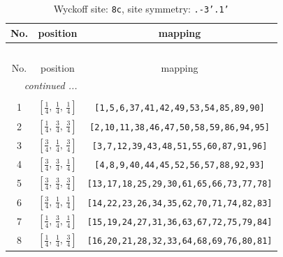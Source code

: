 \documentclass[fleqn,8pt]{jsarticle}
\begin{document}
\begin{longtable}{ccc}
\caption{Wyckoff site: {\tt 8c}, site symmetry: {\tt .-3'.1'}}
 \\
 \hline \hline
No. & position & mapping \\ \hline \endfirsthead

\multicolumn{2}{l}{\tablename\ \thetable{}} \\
 \hline \hline
No. & position & mapping \\ \hline \endhead

 \hline \hline
\multicolumn{2}{r}{\footnotesize\it continued ...} \\ \endfoot

 \hline \hline
\multicolumn{2}{r}{} \\ \endlastfoot

1 & $\left[ \frac{1}{4},\, \frac{1}{4},\, \frac{1}{4} \right]$ & {\tt [1,5,6,37,41,42,49,53,54,85,89,90]} \\ \hline
2 & $\left[ \frac{1}{4},\, \frac{3}{4},\, \frac{3}{4} \right]$ & {\tt [2,10,11,38,46,47,50,58,59,86,94,95]} \\ \hline
3 & $\left[ \frac{3}{4},\, \frac{1}{4},\, \frac{3}{4} \right]$ & {\tt [3,7,12,39,43,48,51,55,60,87,91,96]} \\ \hline
4 & $\left[ \frac{3}{4},\, \frac{3}{4},\, \frac{1}{4} \right]$ & {\tt [4,8,9,40,44,45,52,56,57,88,92,93]} \\ \hline
5 & $\left[ \frac{3}{4},\, \frac{3}{4},\, \frac{3}{4} \right]$ & {\tt [13,17,18,25,29,30,61,65,66,73,77,78]} \\ \hline
6 & $\left[ \frac{3}{4},\, \frac{1}{4},\, \frac{1}{4} \right]$ & {\tt [14,22,23,26,34,35,62,70,71,74,82,83]} \\ \hline
7 & $\left[ \frac{1}{4},\, \frac{3}{4},\, \frac{1}{4} \right]$ & {\tt [15,19,24,27,31,36,63,67,72,75,79,84]} \\ \hline
8 & $\left[ \frac{1}{4},\, \frac{1}{4},\, \frac{3}{4} \right]$ & {\tt [16,20,21,28,32,33,64,68,69,76,80,81]} \\
\end{longtable}
\renewcommand{\arraystretch}{1.2}
\end{document}
